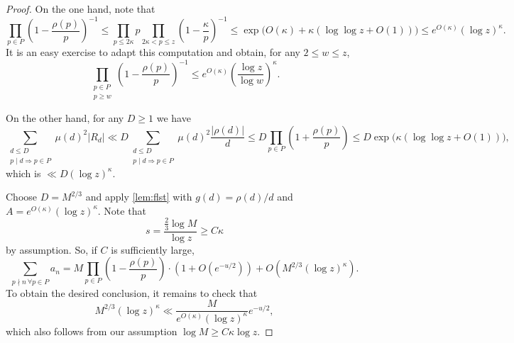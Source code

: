 \documentclass[11pt]{amsart}
\theoremstyle{definition}
\renewcommand{\leq}{\leqslant}
\renewcommand{\geq}{\geqslant}
\begin{document}
\begin{proof}
On the one hand, note that
\begin{equation*}
\prod_{p\in P} \left(1-\frac{\rho(p)}{p}\right)^{-1} \leq \prod_{p\leq 2\kappa} p \prod_{2\kappa < p\leq z} \left(1-\frac{\kappa}{p}\right)^{-1} \leq \exp \Big(O(\kappa) + \kappa (\log \log z + O(1))\Big) \leq e^{O(\kappa)}(\log z)^{\kappa}.
\end{equation*}
It is an easy exercise to adapt this computation and obtain, for any $2\leq w\leq z$, 
\begin{equation*}
\prod_{\substack{p\in P\\p\geq w}} \left(1-\frac{\rho(p)}{p}\right)^{-1}  \leq e^{O(\kappa)}\left(\frac{\log z}{\log w}\right)^{\kappa}.
\end{equation*}

On the other hand, for any $D\geq 1$ we have
\begin{equation*}
\sum_{\substack{d\leq D\\p\mid d \Rightarrow p\in P}} \mu(d)^2|R_d| \ll D\!\!\!\sum_{\substack{d\leq D\\p\mid d \Rightarrow p\in P}} \mu(d)^2\frac{|\rho(d)|}{d} \leq D \prod_{p\in P} \left(1+\frac{\rho(p)}{p}\right) \leq D \exp \Big(\kappa (\log \log z+O(1))\Big),
\end{equation*}
which is $\ll D (\log z)^{\kappa}$.

Choose $D = M^{2/3}$ and apply \cref{lem:flst} with $g(d) = \rho(d)/d$ and $A = e^{O(\kappa)} (\log z)^{\kappa}$. Note that
\begin{equation*}
s= \frac{\tfrac23 \log M}{\log z} \geq C\kappa
\end{equation*}
by assumption. So, if $C$ is sufficiently large, 
\begin{equation*}
\sum_{p\nmid n \, \forall p\in P} a_n = M\prod_{p\in P}\left(1-\frac{\rho(p)}{p}\right) \cdot \left(1+O\left(e^{-u/2}\right)\right) + O\left(M^{2/3} (\log z)^{\kappa}\right).
\end{equation*}
To obtain the desired conclusion, it remains to check that 
\begin{equation*}
M^{2/3} (\log z)^{\kappa} \ll \frac{M}{e^{O(\kappa)}(\log z)^{\kappa}} e^{-u/2},
\end{equation*}
which also follows from our assumption $\log M \geq C\kappa \log z$.
\end{proof}
\end{document}
